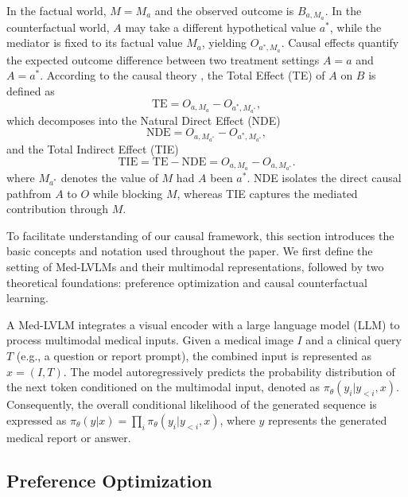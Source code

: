In the factual world, $M=M_a$ and the observed outcome is $B_{a,M_a}$. In the counterfactual world, $A$ may take a different hypothetical value $a^*$, while the mediator is fixed to its factual value $M_a$, yielding $O_{a^*,M_a}$. Causal effects quantify the expected outcome difference between two treatment settings $A=a$ and $A=a^*$. According to the causal theory \cite{pearl2014interpretation}, the Total Effect (TE) of $A$ on $B$ is defined as
\begin{equation}
\text{TE} = O_{a,M_a} - O_{a^*,M_{a^*}},
\end{equation}which decomposes into the Natural Direct Effect (NDE) 
\begin{equation}
\text{NDE} = O_{a,M_{a^*}} - O_{a^*,M_{a^*}},
\end{equation}
and the Total Indirect Effect (TIE) 
\begin{equation}
\text{TIE} = \text{TE} - \text{NDE} = O_{a,M_a} - O_{a,M_{a^*}}.
\end{equation}
where $M_{a^*}$ denotes the value of $M$ had $A$ been $a^*$\cite{pearl2016causal}. NDE isolates the direct causal pathfrom $A$ to $O$ while blocking $M$, whereas TIE captures the mediated contribution through $M$.












\iffalse
To facilitate understanding of our causal framework, this section introduces the basic concepts and notation used throughout the paper. We first define the setting of Med-LVLMs and their multimodal representations, followed by two theoretical foundations: preference optimization and causal counterfactual learning.

A Med-LVLM integrates a visual encoder with a large language model (LLM) to process multimodal medical inputs. Given a medical image $I$ and a clinical query $T$ (e.g., a question or report prompt), the combined input is represented as $x = (I, T)$. The model autoregressively predicts the probability distribution of the next token conditioned on the multimodal input, denoted as $\pi_\theta(y_i|y_{<i},x)$. Consequently, the overall conditional likelihood of the generated sequence is expressed as $\pi_\theta(y|x) = \prod_i \pi_\theta(y_i|y_{<i},x)$, where $y$ represents the generated medical report or answer.

\subsection{Preference Optimization}

